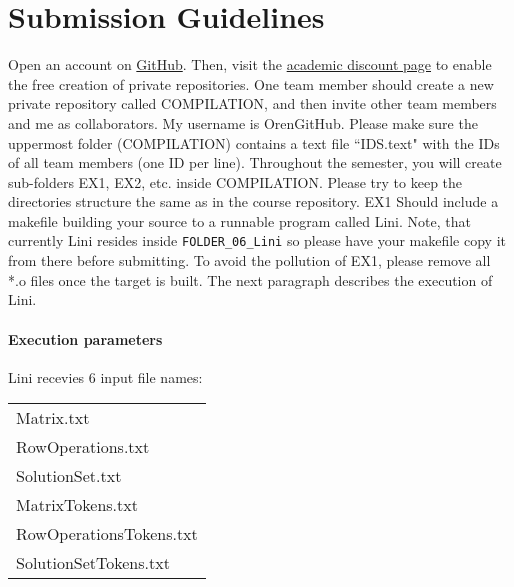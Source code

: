 \documentclass{article}
\begin{document}
\section{Submission Guidelines}
Open an account on \href{https://github.com/}{GitHub}.
Then, visit the
\href{https://education.github.com/discount_requests/new}{academic discount page}
to enable the free creation of private repositories.
One team member should create a new private repository called COMPILATION,
and then invite other team members and me as collaborators.
My username is OrenGitHub.
Please make sure the uppermost folder (COMPILATION) contains a text file ``IDS.text" with the IDs of all team members (one ID per line).
Throughout the semester, you will create sub-folders EX1, EX2, etc. inside COMPILATION.
Please try to keep the directories structure the same as in the course repository.
EX1 Should include a makefile building your source to a runnable program called Lini.
Note, that currently Lini resides inside \verb"FOLDER_06_Lini" so please have your makefile copy it from there before submitting.
To avoid the pollution of EX1, please remove all *.o files once the target is built.
The next paragraph describes the execution of Lini.

\paragraph{Execution parameters}
Lini recevies $6$ input file names:
\begin{table}[h]
\centering
\begin{tabular}{ l }
  Matrix.txt              \\
  RowOperations.txt       \\
  SolutionSet.txt         \\
  MatrixTokens.txt        \\
  RowOperationsTokens.txt \\
  SolutionSetTokens.txt   \\
\end{tabular}
\end{table}
\end{document}
